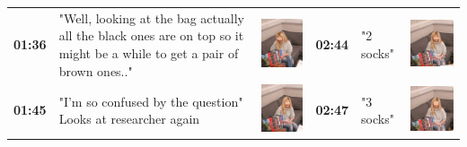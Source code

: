 \documentclass[twocolumn, serif, empirical, authordate]{jote-article}
\begin{document}
\begin{table}[ht!]
\begin{mdframed}[linecolor=jotedark]
\begin{tabularx}{\linewidth}{@{} p{.05\linewidth} p{.28\linewidth} >{\raggedleft\arraybackslash}p{.1\linewidth}  p{.05\linewidth} p{.28\linewidth} >{\raggedleft\arraybackslash}p{.1\linewidth} @{}}
\textbf{01:36} & "Well, looking at the bag actually all the black ones are on top so it might be a while to get a pair of brown ones.." & \includegraphics[height=.09\textheight, valign=t]{media/image18.png} &
 \textbf{02:44} & "2 socks" & \includegraphics[height=.09\textheight, valign=t]{media/image26.png} \\ 
 
\textbf{01:45} & "I'm so confused by the question" Looks at researcher again & \includegraphics[height=.09\textheight, valign=t]{media/image19.png} &
  \textbf{02:47} & "3 socks" & \includegraphics[height=.09\textheight, valign=t]{media/image27.png} \\ 


\end{tabularx}
\end{mdframed}
\end{table}
\end{document}
